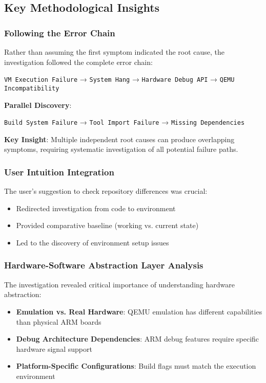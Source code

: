 \documentclass[11pt,a4paper]{article}
\begin{document}
\subsection{Key Methodological Insights}

\subsubsection{Following the Error Chain}

Rather than assuming the first symptom indicated the root cause, the investigation followed the complete error chain:

\begin{center}
\texttt{VM Execution Failure} → \texttt{System Hang} → \texttt{Hardware Debug API} → \texttt{QEMU Incompatibility}
\end{center}

\textbf{Parallel Discovery}:
\begin{center}
\texttt{Build System Failure} → \texttt{Tool Import Failure} → \texttt{Missing Dependencies}
\end{center}

\textbf{Key Insight}: Multiple independent root causes can produce overlapping symptoms, requiring systematic investigation of all potential failure paths.

\subsubsection{User Intuition Integration}

The user's suggestion to check repository differences was crucial:
\begin{itemize}
\item Redirected investigation from code to environment
\item Provided comparative baseline (working vs. current state)
\item Led to the discovery of environment setup issues
\end{itemize}

\subsubsection{Hardware-Software Abstraction Layer Analysis}

The investigation revealed critical importance of understanding hardware abstraction:

\begin{itemize}
\item \textbf{Emulation vs. Real Hardware}: QEMU emulation has different capabilities than physical ARM boards
\item \textbf{Debug Architecture Dependencies}: ARM debug features require specific hardware signal support
\item \textbf{Platform-Specific Configurations}: Build flags must match the execution environment
\end{itemize}
\end{document}
